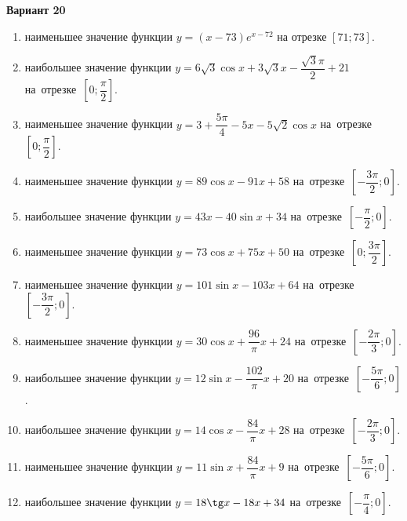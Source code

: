 \documentclass[a4paper,10pt]{article}
\begin{document}
\begin{center}\Large\textbf{Вариант 20}\end{center}

\begin{enumerate}
\item {} наименьшее значение функции $y = \left(x-73\right)e^{x-72}$ на отрезке $\left[71;73\right]$.

\item {} наибольшее значение функции $y = 6\sqrt{3}\cos x+3\sqrt{3}x-\dfrac{\sqrt{3}\pi}{2} +21$ на~отрезке~$\left[0;\dfrac{\pi }{2}\right]$.

\item {} наименьшее значение функции $y=3+\dfrac{5\pi }{4}-5x-5\sqrt{2}\cos x$ на~отрезке~$\left[0;\dfrac{\pi }{2}\right]$.

\item {} наименьшее значение функции $y = 89\cos x-91x+58$ на~отрезке~$\left[-\dfrac{3\pi }{2};0\right]$.

\item {} наибольшее значение функции $y = 43x-40\sin x+34$ на~отрезке~$\left[-\dfrac{\pi }{2};0\right]$.

\item {} наименьшее значение функции $y = 73\cos x+75x+50$ на~отрезке~$\left[0;\dfrac{3\pi }{2}\right]$.

\item {} наименьшее значение функции $y = 101\sin x-103x+64$ на~отрезке~$\left[-\dfrac{3\pi }{2};0\right]$.

\item {} наименьшее значение функции $y = 30\cos x+\dfrac{96}{\pi }x +24$ на~отрезке~$\left[-\dfrac{2\pi }{3};0\right]$.

\item {} наибольшее значение функции $y = 12\sin x-\dfrac{102}{\pi }x+20$ на~отрезке~$\left[-\dfrac{5\pi }{6};0\right]$.

\item {} наибольшее значение функции $y = 14\cos x-\dfrac{84}{\pi }x+28$ на~отрезке~$\left[-\dfrac{2\pi }{3};0\right]$.

\item {} наименьшее значение функции $y = 11\sin x+\dfrac{84}{\pi }x+9$ на~отрезке~$\left[-\dfrac{5\pi }{6};0\right]$.

\item {} наибольшее значение функции $y = 18\tg x-18x+34$ на~отрезке~$\left[-\dfrac{\pi }{4};0\right]$.


\end{enumerate}
\end{document}
